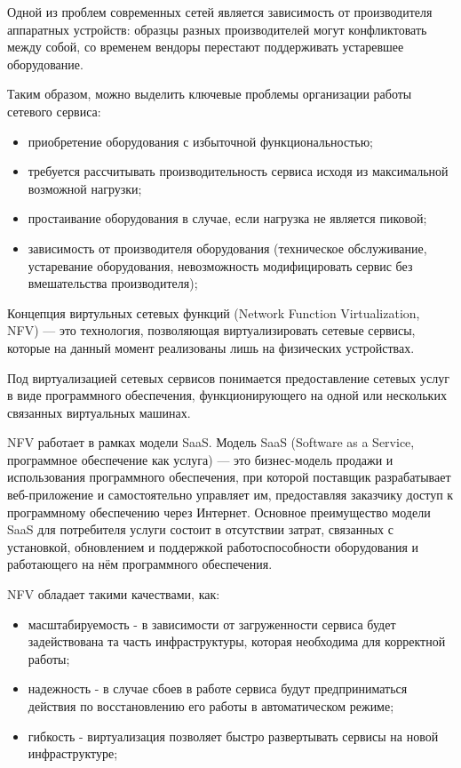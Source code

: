\documentclass[oneside,final,14pt,a4paper]{extreport}
\begin{document}
Одной из проблем современных сетей является зависимость от производителя аппаратных устройств: образцы разных производителей могут конфликтовать между собой, со временем вендоры перестают поддерживать устаревшее оборудование.

Таким образом, можно выделить ключевые проблемы организации работы сетевого сервиса:
\begin{itemize}
	\item приобретение оборудования с избыточной функциональностью;
	\item требуется рассчитывать производительность сервиса исходя из максимальной возможной нагрузки;
	\item простаивание оборудования в случае, если нагрузка не является пиковой;
	\item зависимость от производителя оборудования (техническое обслуживание, устаревание оборудования, невозможность модифицировать сервис без вмешательства производителя);
\end{itemize}

Концепция виртульных сетевых функций (Network Function Virtualization, NFV) --- это технология, позволяющая виртуализировать сетевые сервисы, которые на данный момент реализованы лишь на физических устройствах.

Под виртуализацией сетевых сервисов понимается предоставление сетевых услуг в виде программного обеспечения, функционирующего на одной или нескольких связанных виртуальных машинах.

NFV работает в рамках модели SaaS. Модель SaaS (Software as a Service, программное обеспечение как услуга) --- это бизнес-модель продажи и использования программного обеспечения, при которой поставщик разрабатывает веб-приложение и самостоятельно управляет им, предоставляя заказчику доступ к программному обеспечению через Интернет. Основное преимущество модели SaaS для потребителя услуги состоит в отсутствии затрат, связанных с установкой, обновлением и поддержкой работоспособности оборудования и работающего на нём программного обеспечения.~\cite{bib:saas}

NFV обладает такими качествами, как:

\begin{itemize}
	\item масштабируемость - в зависимости от загруженности сервиса будет задействована та часть инфраструктуры, которая необходима для корректной работы;
	\item надежность - в случае сбоев в работе сервиса будут предприниматься действия по восстановлению его работы в автоматическом режиме;
	\item гибкость - виртуализация позволяет быстро развертывать сервисы на новой инфраструктуре;
\end{itemize}
\end{document}
